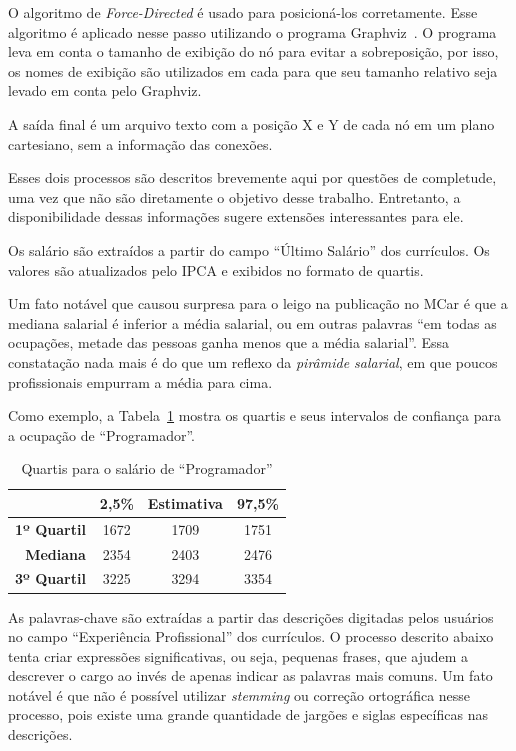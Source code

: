 \documentclass[12pt,a4paper]{article}
\begin{document}
O algoritmo de \textit{Force-Directed} é usado para posicioná-los corretamente. Esse algoritmo é aplicado nesse passo utilizando o programa Graphviz~\cite{Gansner2000-oo}. O programa leva em conta o tamanho de exibição do nó para evitar a sobreposição, por isso, os nomes de exibição são utilizados em cada para que seu tamanho relativo seja levado em conta pelo Graphviz.

A saída final é um arquivo texto com a posição X e Y de cada nó em um plano cartesiano, sem a informação das conexões.

Esses dois processos são descritos brevemente aqui por questões de completude, uma vez que não são diretamente o objetivo desse trabalho. Entretanto, a disponibilidade dessas informações sugere extensões interessantes para ele.

Os salário são extraídos a partir do campo \enquote{Último Salário} dos currículos. Os valores são atualizados pelo IPCA e exibidos no formato de quartis.

Um fato notável que causou surpresa para o leigo na publicação no MCar é que a mediana salarial é inferior a média salarial, ou em outras palavras \enquote{em todas as ocupações, metade das pessoas ganha menos que a média salarial}. Essa constatação nada mais é do que um reflexo da \textit{pirâmide salarial}, em que poucos profissionais empurram a média para cima.

Como exemplo, a Tabela~\ref{tab:resumo-salario-programador} mostra os quartis e seus intervalos de confiança para a ocupação de \enquote{Programador}.

\begin{table}[htb]
    \centering
    \begin{tabular}{r|c|c|c}
        & \textbf{2,5\%} & \textbf{Estimativa} & \textbf{97,5\%} \\ \hline
        \textbf{1º Quartil} & 1672           & 1709                & 1751 \\ \hline
        \textbf{Mediana}    & 2354           & 2403                & 2476 \\ \hline
        \textbf{3º Quartil} & 3225           & 3294                & 3354 \\
    \end{tabular}
    \caption{Quartis para o salário de \enquote{Programador}}
    \label{tab:resumo-salario-programador}
\end{table}

As palavras-chave são extraídas a partir das descrições digitadas pelos usuários no campo \enquote{Experiência Profissional} dos currículos. O processo descrito abaixo tenta criar expressões significativas, ou seja, pequenas frases, que ajudem a descrever o cargo ao invés de apenas indicar as palavras mais comuns. Um fato notável é que não é possível utilizar \textit{stemming} ou correção ortográfica nesse processo, pois existe uma grande quantidade de jargões e siglas específicas nas descrições.
\end{document}
